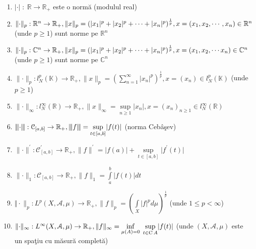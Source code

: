 \documentclass[ a4paper, 12pt]{report}
\theoremstyle{remark}
\numberwithin{equation}{section}
\newcommand{\ds}{\displaystyle}
\begin{document}
\begin{enumerate}
\item $\lvert \cdot \lvert \;: \; \mathbb{R} \rightarrow \mathbb{R}_{+}$ este o norm\u a (modulul real)
\item $\lVert \cdot \rVert_p : \mathbb{R}^{n} \rightarrow \mathbb{R}_{+}, \lVert x \rVert_{p} = (\lvert x_1\rvert^{p} + \lvert x_2\rvert^{p} + \cdots + \lvert x_n\rvert^{p})^{\frac{1}{p}},\\
 x = (x_1,x_2, \cdots, x_n) \in \mathbb{R}^{n}$ (unde $p \geq 1$) sunt norme pe $\mathbb{R}^{n}$
\item $\lVert \cdot \rVert_p : \mathbb{C}^{n} \rightarrow \mathbb{R}_{+}, \lVert x \rVert_{p} = (\lvert x_1\rvert^{p} + \lvert x_2\rvert^{p} + \cdots + \lvert x_n\rvert^{p})^{\frac{1}{p}},\\
 x = (x_1,x_2, \cdots x_n) \in \mathbb{C}^{n}$ (unde $p \geq 1$) sunt norme pe $\mathbb{C}^{n}$
\item $\lVert \cdot \rVert_p : l_{N}^{p}(\mathbb{K}) \rightarrow \mathbb{R}_{+}, \lVert x \rVert_{p} = (\sum\limits_{n=1}^{\infty} \lvert x_n \rvert^p)^{\frac{1}{p}}, x = (x_n) \in l_{N}^{p}(\mathbb{K})$ (unde $p \geq 1$)
\item $\lVert \cdot \rVert_{\infty} : l_{N}^{\infty}(\mathbb{R}) \rightarrow \mathbb{R}_{+}, \lVert x \rVert_{\infty} = \sup\limits_{n \geq 1} \lvert x_n \rvert, x = (x_n)_{n \geq 1} \in l_{N}^{\infty}(\mathbb{R})$
\item ${\left\vert\kern-0.25ex\left\vert\kern-0.25ex\left\vert \cdot \right\vert\kern-0.25ex\right\vert\kern-0.25ex\right\vert} : \mathcal{C}_{[a,b]} \rightarrow \mathbb{R}_{+}, {\left\vert\kern-0.25ex\left\vert\kern-0.25ex\left\vert f \right\vert\kern-0.25ex\right\vert\kern-0.25ex\right\vert} = \sup\limits_{t \in [a,b]} \lvert f(t) \rvert$ (norma Ceb\^ a\c sev)
\item  $\lVert \cdot \rVert^{'} : \mathcal{C}^{'}_{[a,b]} \rightarrow \mathbb{R}_{+}, \lVert f \rVert^{'} = \lvert f(a) \rvert + \sup\limits_{t \in [a,b]} \lvert f^{'}(t) \rvert$
\item $\lVert \cdot \rVert_{1} : \mathcal{C}_{[a,b]} \rightarrow \mathbb{R}_{+}, \lVert f \rVert_{1} = \ds\int\limits_a^b \lvert f(t) \rvert dt $
\item $\Vert \cdot \rVert_{p} : L^{p}(X,\mathcal{A},\mu) \rightarrow \mathbb{R}_{+}, \lVert f \rVert_{p} = \left (  \ds\int\limits_{X}\lvert f \rvert^{p} d\mu \right )^{\frac{1}{p}}$ (unde $1 \leq p < \infty $)
\item $\lVert \cdot \rVert_{\infty} : L^{\infty}(X, \mathcal{A}, \mu) \rightarrow \mathbb{R}_{+}, \lVert f \rVert_{\infty} = \inf\limits_{\mu(A) = 0} \; \sup\limits_{t \in {\rm C}\, A} \lvert f(t) \rvert$ (unde $(X, \mathcal{A}, \mu)$ este un spa\c tiu cu m\u asur\u a complet\u a)
\end{enumerate}
\end{document}
